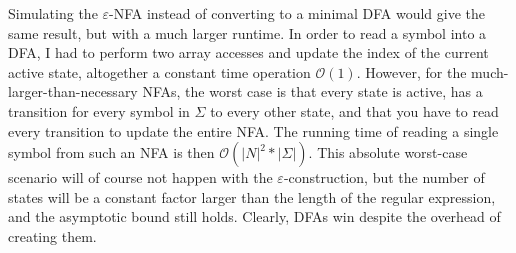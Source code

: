 \documentclass{article}
\begin{document}
Simulating the $\varepsilon$-NFA instead of converting to a minimal DFA would give the same result, but with a much larger runtime. In order to read a symbol into a DFA, I had to perform two array accesses and update the index of the current active state, altogether a constant time operation $\mathcal{O}(1)$. However, for the much-larger-than-necessary NFAs, the worst case is that every state is active, has a transition for every symbol in $\Sigma$ to every other state, and that you have to read every transition to update the entire NFA. The running time of reading a single symbol from such an NFA is then $\mathcal{O}(|N|^2*|\Sigma|)$. This absolute worst-case scenario will of course not happen with the $\varepsilon$-construction, but the number of states will be a constant factor larger than the length of the regular expression, and the asymptotic bound still holds. Clearly, DFAs win despite the overhead of creating them.
\end{document}
